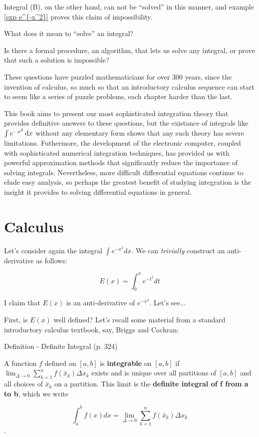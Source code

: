 Integral (B), on the other hand, can not be ``solved'' in
this manner, and example \ref{exp e^{-x^2}} proves this
claim of impossibility.

What does it mean to ``solve'' an integral?

Is there a formal procedure, an algorithm, that lets us solve
any integral, or prove that such a solution is impossible?

These questions have puzzled mathematicians for over 300 years, since
the invention of calculus, so much so that an introductory calculus
sequence can start to seem like a series of puzzle problems, each
chapter harder than the last.

This book aims to present our most sophisticated integration theory
that provides definitive answers to these questions, but the existance
of integrals like $\int e^{-x^2} \,\mathrm{d} x$ without any elementary form shows that any such theory has
severe limitations.  Futhermore, the development of the electronic
computer, coupled with sophisticated numerical integration techniques,
has provided us with powerful approximation methods that significantly
reduce the importance of solving integrals.  Nevertheless, more
difficult differential equations continue to elude easy analysis, so
perhaps the greatest benefit of studying integration is the insight it
provides to solving differential equations in general.

\vfill\eject
\section{Calculus}
Let's consider again the integral $\int e^{-x^2} dx$.  We can {\it trivially} construct
an anti-derivative as follows:

$$E(x) = \int_0^x e^{-t^2} dt$$

I claim that $E(x)$ is an anti-derivative of $e^{-x^2}$.  Let's see...

First, is $E(x)$ well defined?  Let's recall some material from a standard
introductory calculus textbook, say, Briggs and Cochran:

\begin{framed}
Definition - Definite Integral (p. 324)

A function $f$ defined on $[a,b]$ is {\bf integrable} on $[a,b]$ if $\lim_{\Delta\to0}\sum_{k=1}^{n}f(\bar{x}_k)\Delta x_k$
exists and is unique over all partitions of $[a,b]$ and all choices of $\bar{x}_k$ on a partition.
This limit is the {\bf definite integral of f from a to b}, which we write

$$\int_a^b f(x) dx = \lim_{\Delta\to0}\sum_{k=1}^{n}f(\bar{x}_k)\Delta x_k $$.
\end{framed}

